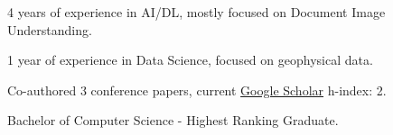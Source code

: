 \begin{zitemize}
    \item 4 years of experience in AI/DL, mostly focused on Document Image Understanding.
    \item 1 year of experience in Data Science, focused on geophysical data.
    \item Co-authored 3 conference papers, current \href{https://scholar.google.com/citations?user=iRZlaI8AAAAJ}{Google Scholar} h-index: 2.
    \item Bachelor of Computer Science - Highest Ranking Graduate.
\end{zitemize}
